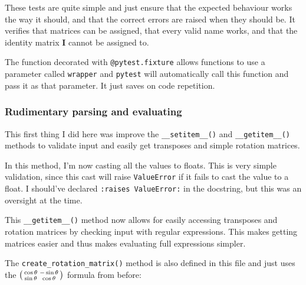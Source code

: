 \documentclass[../main.tex]{subfiles}
\begin{document}

These tests are quite simple and just ensure that the expected behaviour works the way it should, and that the correct errors are raised when they should be. It verifies that matrices can be assigned, that every valid name works, and that the identity matrix \textbf{I} cannot be assigned to.

The function decorated with \texttt{@pytest.fixture} allows functions to use a parameter called \texttt{wrapper} and \texttt{pytest} will automatically call this function and pass it as that parameter. It just saves on code repetition.

\subsubsection{Rudimentary parsing and evaluating\label{development:matrices-backend:rudimentary-parsing-and-evaluating}}

This first thing I did here was improve the \texttt{\_\_setitem\_\_()} and \texttt{\_\_getitem\_\_()} methods to validate input and easily get transposes and simple rotation matrices.


In this method, I'm now casting all the values to floats. This is very simple validation, since this cast will raise \texttt{ValueError} if it fails to cast the value to a float. I should've declared \texttt{:raises ValueError:} in the docstring, but this was an oversight at the time.


This \texttt{\_\_getitem\_\_()} method now allows for easily accessing transposes and rotation matrices by checking input with regular expressions. This makes getting matrices easier and thus makes evaluating full expressions simpler.

The \texttt{create\_rotation\_matrix()} method is also defined in this file and just uses the $\begin{psmallmatrix}\cos\theta & -\sin\theta\\\sin\theta & \cos\theta\end{psmallmatrix}$ formula from before:

\end{document}

